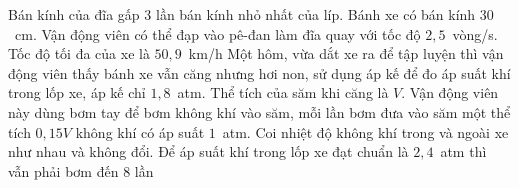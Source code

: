 \begin{ex}
		{\True Bán kính của đĩa gấp $3$ lần bán kính nhỏ nhất của líp. Bánh xe có bán kính $30$~cm. Vận động viên có thể đạp vào pê-đan làm đĩa quay với tốc độ $2{,}5$~vòng/s. Tốc độ tối đa của xe là $50{,}9$~km/h}
		{Một hôm, vừa dắt xe ra để tập luyện thì vận động viên thấy bánh xe vẫn căng nhưng hơi non, sử dụng áp kế để đo áp suất khí trong lốp xe, áp kế chỉ $1{,}8$~atm. Thể tích của săm khi căng là $V$. Vận động viên này dùng bơm tay để bơm không khí vào săm, mỗi lần bơm đưa vào săm một thể tích $0{,}15V$ không khí có áp suất $1$~atm. Coi nhiệt độ không khí trong và ngoài xe như nhau và không đổi. Để áp suất khí trong lốp xe đạt chuẩn là $2{,}4$~atm thì vẫn phải bơm đến $8$ lần}
	\end{ex}


